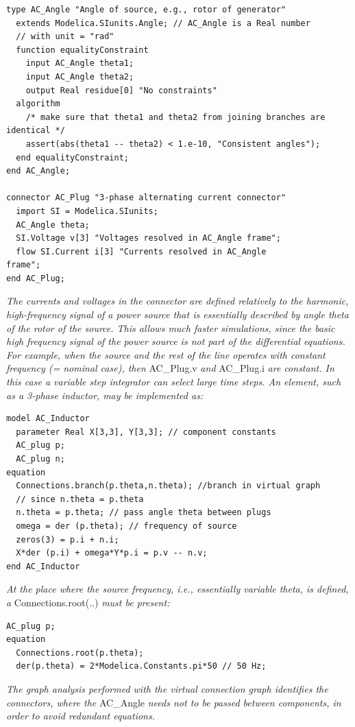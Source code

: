 \documentclass[10pt,a4paper]{report}
\begin{document}
\begin{lstlisting}[language=modelica]
type AC_Angle "Angle of source, e.g., rotor of generator"
  extends Modelica.SIunits.Angle; // AC_Angle is a Real number
  // with unit = "rad"
  function equalityConstraint
    input AC_Angle theta1;
    input AC_Angle theta2;
    output Real residue[0] "No constraints"
  algorithm
    /* make sure that theta1 and theta2 from joining branches are identical */
    assert(abs(theta1 -- theta2) < 1.e-10, "Consistent angles");
  end equalityConstraint;
end AC_Angle;

connector AC_Plug "3-phase alternating current connector"
  import SI = Modelica.SIunits;
  AC_Angle theta;
  SI.Voltage v[3] "Voltages resolved in AC_Angle frame";
  flow SI.Current i[3] "Currents resolved in AC_Angle
frame";
end AC_Plug;
\end{lstlisting}
\emph{The currents and voltages in the connector are defined relatively
to the harmonic, high-frequency signal of a power source that is
essentially described by angle theta of the rotor of the source. This
allows much faster simulations, since the basic high frequency signal of
the power source is not part of the differential equations. For example,
when the source and the rest of the line operates with constant
frequency (= nominal case), then} AC\_Plug.v \emph{and} AC\_Plug.i
\emph{are constant. In this case a variable step integrator can select
large time steps. An element, such as a 3-phase inductor, may be
implemented as:}

\begin{lstlisting}[language=modelica]
model AC_Inductor
  parameter Real X[3,3], Y[3,3]; // component constants
  AC_plug p;
  AC_plug n;
equation
  Connections.branch(p.theta,n.theta); //branch in virtual graph
  // since n.theta = p.theta
  n.theta = p.theta; // pass angle theta between plugs
  omega = der (p.theta); // frequency of source
  zeros(3) = p.i + n.i;
  X*der (p.i) + omega*Y*p.i = p.v -- n.v;
end AC_Inductor
\end{lstlisting}
\emph{At the place where the source frequency, i.e., essentially
variable theta, is defined, a} Connections.root(..) \emph{must be
present:}

\begin{lstlisting}[language=modelica]
  AC_plug p;
equation
  Connections.root(p.theta);
  der(p.theta) = 2*Modelica.Constants.pi*50 // 50 Hz;
\end{lstlisting}
\emph{The graph analysis performed with the virtual connection graph
identifies the connectors, where the} AC\_Angle \emph{needs not to be
passed between components, in order to avoid redundant equations.}
\end{document}
